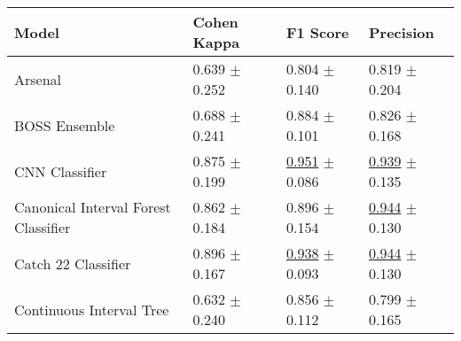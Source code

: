 
\begin{tabular}{llll}
\toprule
Model & Cohen Kappa & F1 Score & Precision \\
\midrule
Arsenal & \textcolor[rgb]{0.6596931660,0.3403068340,0}{0.639} $\pm$ \textcolor[rgb]{1.0000000000,0.0000000000,0}{0.252} & \textcolor[rgb]{1.0000000000,0.0000000000,0}{0.804} $\pm$ \textcolor[rgb]{0.8357157401,0.1642842599,0}{0.140} & \textcolor[rgb]{0.6111111111,0.3888888889,0}{0.819} $\pm$ \textcolor[rgb]{1.0000000000,0.0000000000,0}{0.204} \\
BOSS Ensemble & \textcolor[rgb]{0.5523012552,0.4476987448,0}{0.688} $\pm$ \textcolor[rgb]{0.9466479801,0.0533520199,0}{0.241} & \textcolor[rgb]{0.5213270142,0.4786729858,0}{0.884} $\pm$ \textcolor[rgb]{0.3920433725,0.5000000000,0}{0.101} & \textcolor[rgb]{0.5833333333,0.4166666667,0}{0.826} $\pm$ \textcolor[rgb]{0.6720690907,0.3279309093,0}{0.168} \\
CNN Classifier & \textcolor[rgb]{0.1380753138,0.5000000000,0}{0.875} $\pm$ \textcolor[rgb]{0.7390823473,0.2609176527,0}{0.199} & \underline{\textcolor[rgb]{0.1240844464,0.5000000000,0}{0.951}} $\pm$ \textcolor[rgb]{0.2169510536,0.5000000000,0}{0.086} & \underline{\textcolor[rgb]{0.1313131313,0.5000000000,0}{0.939}} $\pm$ \textcolor[rgb]{0.3596000651,0.5000000000,0}{0.135} \\
Canonical Interval Forest Classifier & \textcolor[rgb]{0.1656903766,0.5000000000,0}{0.862} $\pm$ \textcolor[rgb]{0.6604374232,0.3395625768,0}{0.184} & \textcolor[rgb]{0.4478672986,0.5000000000,0}{0.896} $\pm$ \textcolor[rgb]{1.0000000000,0.0000000000,0}{0.154} & \underline{\textcolor[rgb]{0.1111111111,0.5000000000,0}{0.944}} $\pm$ \textcolor[rgb]{0.3121982484,0.5000000000,0}{0.130} \\
Catch 22 Classifier & \textcolor[rgb]{0.0920502092,0.5000000000,0}{0.896} $\pm$ \textcolor[rgb]{0.5790995120,0.4209004880,0}{0.167} & \underline{\textcolor[rgb]{0.1990521327,0.5000000000,0}{0.938}} $\pm$ \textcolor[rgb]{0.2953042690,0.5000000000,0}{0.093} & \underline{\textcolor[rgb]{0.1111111111,0.5000000000,0}{0.944}} $\pm$ \textcolor[rgb]{0.3121982484,0.5000000000,0}{0.130} \\
Continuous Interval Tree & \textcolor[rgb]{0.6750348675,0.3249651325,0}{0.632} $\pm$ \textcolor[rgb]{0.9379761532,0.0620238468,0}{0.240} & \textcolor[rgb]{0.6872037915,0.3127962085,0}{0.856} $\pm$ \textcolor[rgb]{0.5123479287,0.4876520713,0}{0.112} & \textcolor[rgb]{0.6944444444,0.3055555556,0}{0.799} $\pm$ \textcolor[rgb]{0.6367588713,0.3632411287,0}{0.165} \\

\end{tabular}
